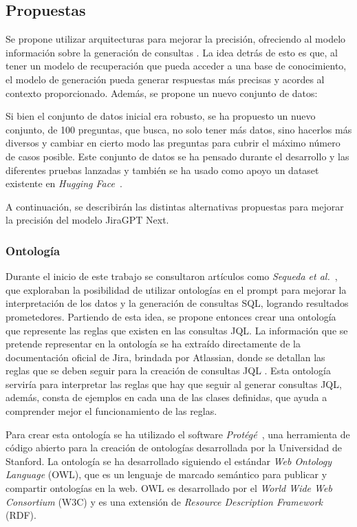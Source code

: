 \subsection{Propuestas}
Se propone utilizar arquitecturas  para mejorar la precisión, ofreciendo al modelo información sobre la generación de consultas . La idea detrás de esto es que, al tener un modelo de recuperación que pueda acceder a una base de conocimiento, el modelo de generación pueda generar respuestas más precisas y acordes al contexto proporcionado. Además, se propone un nuevo conjunto de datos:

Si bien el conjunto de datos inicial era robusto, se ha propuesto un nuevo conjunto, de 100 preguntas, que busca, no solo tener más datos, sino hacerlos más diversos y cambiar en cierto modo las preguntas para cubrir el máximo número de casos posible. Este conjunto de datos se ha pensado durante el desarrollo y las diferentes pruebas lanzadas y también se ha usado como apoyo un dataset existente en \textit{Hugging Face}~\cite{datasetHF}.

A continuación, se describirán las distintas alternativas propuestas para mejorar la precisión del modelo JiraGPT Next.

\subsubsection{Ontología}
Durante el inicio de este trabajo se consultaron artículos como \textit{Sequeda et al.}~\cite{sequeda2023benchmark}, que exploraban la posibilidad de utilizar ontologías en el prompt para mejorar la interpretación de los datos y la generación de consultas SQL, logrando resultados prometedores. Partiendo de esta idea, se propone entonces crear una ontología que represente las reglas que existen en las consultas JQL. La información que se pretende representar en la ontología se ha extraído directamente de la documentación oficial de Jira, brindada por Atlassian, donde se detallan las reglas que se deben seguir para la creación de consultas JQL \cite{jiradocs}. Esta ontología serviría para interpretar las reglas que hay que seguir al generar consultas JQL, además, consta de ejemplos en cada una de las clases definidas, que ayuda a comprender mejor el funcionamiento de las reglas.

Para crear esta ontología se ha utilizado el software \textit{Protégé}~\cite{protege}, una herramienta de código abierto para la creación de ontologías desarrollada por la Universidad de Stanford. La ontología se ha desarrollado siguiendo el estándar \textit{Web Ontology Language} (OWL), que es un lenguaje de marcado semántico para publicar y compartir ontologías en la web. OWL es desarrollado por el \textit{World Wide Web Consortium} (W3C) y es una extensión de \textit{Resource Description Framework} (RDF).
